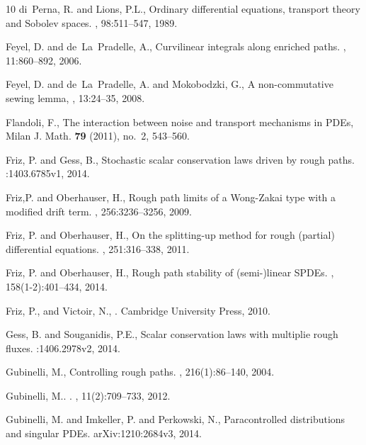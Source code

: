 \documentclass[11pt,a4paper]{amsart}
\numberwithin{equation}{section} %
\begin{document}
\begin{thebibliography}{10}
di~Perna, R. and Lions, P.L.,
\newblock Ordinary differential equations, transport theory and {S}obolev spaces.
, 98:511--547, 1989.

Feyel, D. and de~La~Pradelle, A.,
\newblock Curvilinear integrals along enriched paths.
, 11:860--892, 2006.

Feyel, D. and de~La~Pradelle, A. and Mokobodzki, G.,
\newblock A non-commutative sewing lemma,
, 13:24--35, 2008.

 Flandoli, F.,
  \newblock The interaction between noise and transport mechanisms in PDEs, 
  \newblock Milan J. Math. {\bf 79} (2011), no.~2, 543--560. 

Friz, P. and Gess, B.,
\newblock Stochastic scalar conservation laws driven by rough paths.
:1403.6785v1, 2014.

Friz,P. and Oberhauser, H.,
\newblock Rough path limits of a {W}ong-{Z}akai type with a modified drift term.
, 256:3236--3256, 2009. 
 
Friz, P. and Oberhauser, H.,
\newblock On the splitting-up method for rough (partial) differential equations.
, 251:316--338, 2011.

Friz, P. and Oberhauser, H.,
\newblock Rough path stability of (semi-)linear SPDEs.
, 158(1-2):401--434, 2014.

 Friz, P.,  and  Victoir, N.,
.
\newblock Cambridge University Press, 2010.


Gess, B. and Souganidis, P.E.,
\newblock Scalar conservation laws with multiplie rough fluxes.
:1406.2978v2, 2014.

Gubinelli, M.,
\newblock Controlling rough paths.
, 216(1):86--140, 2004.


Gubinelli, M..
.
, 11(2):709--733, 2012.

Gubinelli, M. and Imkeller, P. and Perkowski, N.,
\newblock Paracontrolled distributions and singular {PDE}s.
\newblock arXiv:1210:2684v3, 2014.


\end{thebibliography}
\end{document}
